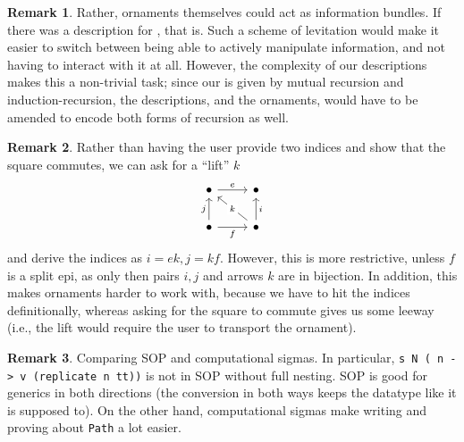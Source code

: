 \documentclass[10pt]{article}
\theoremstyle{plain}
\theoremstyle{definition}
\newtheorem{remark}{Remark}[section]
\newcommand{\investigate}[1]{\par\vspace{1\baselineskip}\textcolor{gray}{#1}\vspace{1\baselineskip}\par}
\begin{document}
\begin{remark}
    Rather, ornaments themselves could act as information bundles. If there was a description for , that is. Such a scheme of levitation would make it easier to switch between being able to actively manipulate information, and not having to interact with it at all. However, the complexity of our descriptions makes this a non-trivial task; since our  is given by mutual recursion and induction-recursion, the descriptions, and the ornaments, would have to be amended to encode both forms of recursion as well.
\end{remark} %

\begin{remark}\label{rem:orn-lift}
    Rather than having the user provide two indices and show that the square commutes, we can ask for a ``lift'' $k$
    \[\begin{tikzcd}
        \bullet & \bullet \\
        \bullet & \bullet
        \arrow["e", from=1-1, to=1-2]
        \arrow["f"', from=2-1, to=2-2]
        \arrow["j", from=2-1, to=1-1]
        \arrow["i"', from=2-2, to=1-2]
        \arrow["k"{description}, from=2-2, to=1-1]
    \end{tikzcd}\]
    and derive the indices as $i = ek, j = kf$. However, this is more restrictive, unless $f$ is a split epi, as only then pairs $i,j$ and arrows $k$ are in bijection. In addition, this makes ornaments harder to work with, because we have to hit the indices definitionally, whereas asking for the square to commute gives us some leeway (i.e., the lift would require the user to transport the ornament). 
\end{remark}




\begin{remark}
    Comparing SOP and computational sigmas. In particular, \texttt{s N (\ n -> v (replicate n tt))} is not in SOP without full nesting. SOP is good for generics in both directions (the conversion in both ways keeps the datatype like it is supposed to). On the other hand, computational sigmas make writing and proving about \texttt{Path} a lot easier.
\end{remark}
\end{document}
